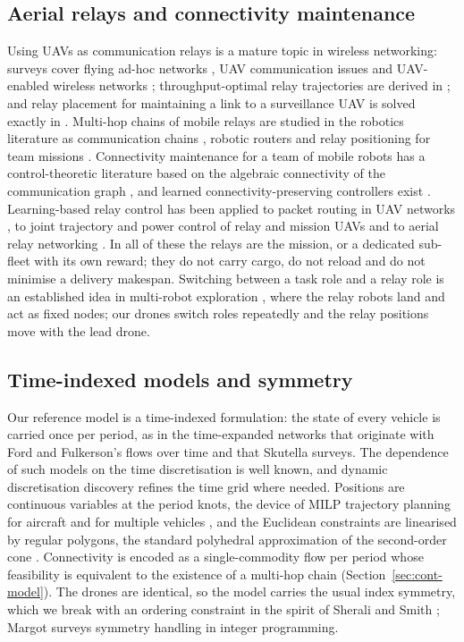 \documentclass[final,5p,times,twocolumn]{elsarticle}
\begin{document}
\subsection{Aerial relays and connectivity maintenance}
\label{sec:rel-relay}
Using UAVs as communication relays is a mature topic in wireless networking: surveys cover flying
ad-hoc networks \cite{bekmezci2013}, UAV communication issues \cite{gupta2016} and UAV-enabled
wireless networks \cite{mozaffari2019}; throughput-optimal relay trajectories are derived in
\cite{zeng2016}; and relay placement for maintaining a link to a surveillance UAV is solved
exactly in \cite{burdakov2010}. Multi-hop chains of mobile relays are studied in the robotics
literature as communication chains \cite{dixon2009}, robotic routers \cite{tekdas2010} and
relay positioning for team missions \cite{yanmaz2022}. Connectivity maintenance for a team of
mobile robots has a control-theoretic literature based on the algebraic connectivity of the
communication graph \cite{zavlanos2007,zavlanos2011}, and learned connectivity-preserving
controllers exist \cite{li2021}. Learning-based relay control has been applied to packet routing
in UAV networks \cite{ding2022}, to joint trajectory and power control of relay and mission UAVs
\cite{mutto2024} and to aerial relay networking \cite{maen2024}. In all of these the relays are
the mission, or a dedicated sub-fleet with its own reward; they do not carry cargo, do not reload
and do not minimise a delivery makespan. Switching between a task role and a relay role is an
established idea in multi-robot exploration \cite{dehoog2009,cesare2015}, where the relay robots
land and act as fixed nodes; our drones switch roles repeatedly and the relay positions move with
the lead drone.

\subsection{Time-indexed models and symmetry}
\label{sec:rel-tenet}
Our reference model is a time-indexed formulation: the state of every vehicle is carried once per
period, as in the time-expanded networks that originate with Ford and Fulkerson's flows over time
\cite{ford1962} and that Skutella \cite{skutella2009} surveys. The dependence of such models on
the time discretisation is well known, and dynamic discretisation discovery \cite{boland2017}
refines the time grid where needed. Positions are continuous variables at the period knots, the
device of MILP trajectory planning for aircraft \cite{richards2002} and for multiple vehicles
\cite{schouwenaars2001}, and the Euclidean constraints are linearised by regular polygons, the
standard polyhedral approximation of the second-order cone \cite{bental2001}. Connectivity is
encoded as a single-commodity flow per period whose feasibility is equivalent to the existence of
a multi-hop chain (Section~\ref{sec:cont-model}). The drones are identical, so the model carries
the usual index symmetry, which we break with an ordering constraint in the spirit of Sherali and
Smith \cite{sherali2001}; Margot \cite{margot2010} surveys symmetry handling in integer
programming.
\end{document}
